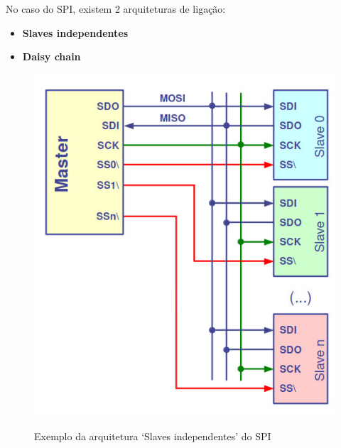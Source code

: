 \documentclass[a4paper, 12pt, onecolumn, twoside]{article}
\begin{document}
No caso do SPI, existem 2 arquiteturas de ligação:
\begin{itemize}
    \item \textbf{Slaves independentes}
    \item \textbf{Daisy chain}
\end{itemize}
\begin{figure}[H]
    \centering
    \begin{minipage}{0.48\textwidth}
        \includegraphics[width=\textwidth]{Arquitetura-de-ligação-1_SPI.jpg}
        \caption{Exemplo da arquitetura `Slaves independentes' do SPI}\label{fig2}
    \end{minipage}
    \hfill
    \begin{minipage}{0.48\textwidth}\label{fig3}

\end{minipage}
\end{figure}
\end{document}

